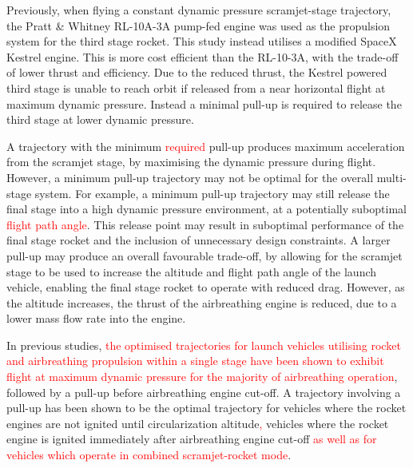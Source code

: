 \documentclass[journal]{new-aiaa}
\begin{document}
 Previously, when flying a constant dynamic pressure scramjet-stage trajectory, the Pratt \& Whitney RL-10A-3A pump-fed engine was used as the propulsion system for the third stage rocket\cite{Preller2017b}. This study instead utilises a modified SpaceX Kestrel engine\cite{Vehicle2008}. This is more cost efficient than the RL-10-3A, with the trade-off of lower thrust and efficiency. Due to the reduced thrust, the Kestrel powered third stage is unable to reach orbit if released from a near horizontal flight at maximum dynamic pressure. Instead a minimal pull-up is required to release the third stage at lower dynamic pressure.

 A trajectory with the minimum \textcolor{red}{required} pull-up produces maximum acceleration from the scramjet stage, by maximising the dynamic pressure during flight. However, a minimum pull-up trajectory may not be optimal for the overall multi-stage system. 
 For example, a minimum pull-up trajectory may still release the final stage into a high dynamic pressure environment, at a potentially suboptimal \textcolor{red}{flight path angle}. This release point may result in suboptimal performance of the final stage rocket  and the inclusion of unnecessary design constraints. 
 A larger pull-up may produce an overall favourable trade-off, by allowing for the scramjet stage to be used to increase the altitude and flight path angle of the launch vehicle, enabling the final stage rocket to operate with reduced drag.
 However, as the altitude increases, the thrust of the airbreathing engine is reduced, due to a lower mass flow rate into the engine. 


  
 In previous studies, \textcolor{red}{the optimised trajectories for launch vehicles utilising rocket and airbreathing propulsion within a single stage have been shown to exhibit flight at maximum dynamic pressure for the majority of airbreathing operation}, followed by a pull-up before airbreathing engine cut-off\textcolor{red}{\cite{Powell1991,Lu1993,Trefny1999,Roche2000,Pescetelli2012,Young2006,Bradford2000}}. 
 A trajectory involving a pull-up has been shown to be the optimal trajectory for vehicles where the rocket engines are not ignited until circularization altitude\cite{Powell1991,Lu1993}\textcolor{red}{,} vehicles where the rocket engine is ignited immediately after airbreathing engine cut-off\textcolor{red}{\cite{Trefny1999,Roche2000,Pescetelli2012} as well as for vehicles which operate in combined scramjet-rocket mode\cite{Young2006,Bradford2000}}.
\end{document}
